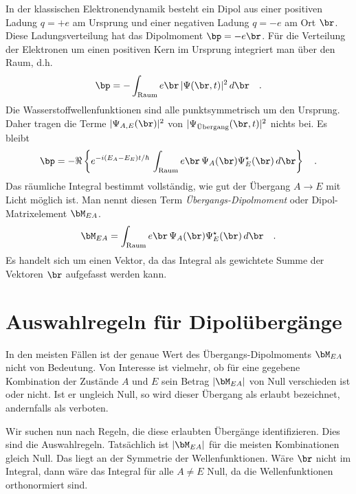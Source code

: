 In der klassischen Elektronendynamik besteht ein Dipol aus einer positiven Ladung $q=+e$ am Ursprung und einer negativen Ladung $q=-e$ am Ort $\br$. Diese Ladungsverteilung hat das Dipolmoment $\bp = -e \br$. Für die Verteilung der Elektronen um einen positiven Kern im Ursprung integriert man über den Raum, d.h. 
\begin{equation}
    \bp = - \int_\text{Raum} e\br \,  | \Psi(\br, t) |^2 \, d \br   \quad .
\end{equation}
Die Wasserstoffwellenfunktionen sind alle punktsymmetrisch um den Ursprung. Daher tragen die Terme $ | \Psi_{A,E}(\br)|^2$ von $| \Psi_\text{Übergang}(\br,t)|^2$ nichts bei. Es bleibt 
\begin{equation}
    \bp =  - \Re \left \{ e^{-i (E_A - E_E) t / \hbar}  \, \int_\text{Raum} e\br \,  \Psi_A(\br)\Psi_E^\star(\br)  \, d \br \right \} \quad .
\end{equation}
Das räumliche Integral bestimmt vollständig, wie gut der Übergang $A \rightarrow E$ mit Licht möglich ist. Man nennt diesen Term \emph{Übergangs-Dipolmoment} oder Dipol-Matrixelement $\bM_{EA}$.
\begin{equation}
    \bM_{EA} = \int_\text{Raum} e\br \,  \Psi_A(\br)\Psi_E^\star(\br)  \, d \br  \quad .
    \label{eq:7_Matrix_element}
\end{equation}
Es handelt sich um einen Vektor, da das Integral als gewichtete Summe der Vektoren $\br$ aufgefasst werden kann.




\section{Auswahlregeln für Dipolübergänge}

In den meisten Fällen ist der genaue Wert des Übergangs-Dipolmoments $\bM_{EA}$ nicht von Bedeutung. Von Interesse ist vielmehr, ob für eine gegebene Kombination der Zustände $A$ und $E$ sein Betrag $|\bM_{EA}|$ von Null verschieden ist oder nicht. Ist er ungleich Null, so wird dieser Übergang als erlaubt bezeichnet, andernfalls als verboten. 

Wir suchen nun nach Regeln, die diese erlaubten Übergänge identifizieren. Dies sind die Auswahlregeln. Tatsächlich ist $|\bM_{EA}|$ für die meisten Kombinationen gleich Null. Das liegt an der Symmetrie der Wellenfunktionen. Wäre $\br$ nicht im Integral, dann wäre das Integral für alle $A \neq E$ Null, da die Wellenfunktionen orthonormiert sind.

